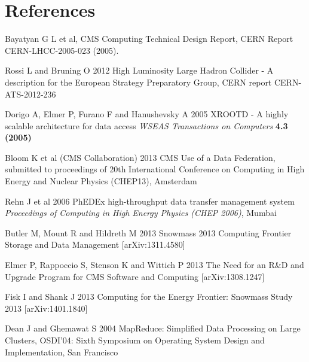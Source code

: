 \documentclass[a4paper]{jpconf}
\begin{document}
\section*{References}
\begin{thebibliography}{9}
 Bayatyan G L et al,  CMS Computing Technical Design
  Report, CERN Report CERN-LHCC-2005-023 (2005).

 Rossi L and Bruning O 2012 High Luminosity Large Hadron
  Collider - A description for the European Strategy Preparatory
  Group, CERN report CERN-ATS-2012-236

 Dorigo A, Elmer P, Furano F and Hanushevsky A 2005
  XROOTD - A highly scalable architecture for data access {\it WSEAS
    Transactions on Computers} {\bf 4.3 (2005)}

 Bloom K et al (CMS Collaboration) 2013 CMS Use of
  a Data Federation, submitted to proceedings of 20th International
  Conference on Computing in High Energy and Nuclear Physics (CHEP13),
  Amsterdam

 Rehn J et al 2006 PhEDEx high-throughput data
  transfer management system {\it Proceedings of Computing in High
    Energy Physics (CHEP 2006)}, Mumbai

 Butler M, Mount R and Hildreth M 2013 Snowmass
  2013 Computing Frontier Storage and Data Management
  [arXiv:1311.4580]

 Elmer P, Rappoccio S, Stenson K and Wittich P 2013
  The Need for an R\&D and Upgrade Program for CMS Software and
  Computing [arXiv:1308.1247]

 Fisk I and Shank J 2013 Computing for the Energy
  Frontier: Snowmass Study 2013 [arXiv:1401.1840]

 Dean J and Ghemawat S 2004 MapReduce: Simplified Data Processing on Large Clusters, OSDI'04: Sixth Symposium on Operating System Design
and Implementation, San Francisco

\end{thebibliography}
\end{document}
